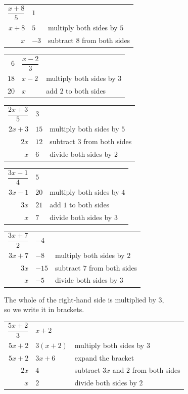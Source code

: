 \documentclass[aspectratio=169]{beamer}
\makeatletter
\newcommand{\steps}[1]{%
  \begin{tabular}{@{}r@{${}={}$}l@{\qquad}l@{}}#1\end{tabular}%
}
\newcommand{\by}[1]{{\normalsize #1}}
\makeatother
\begin{document}
  {\steps{$\dfrac{x+8}{5}$ & $1$ & \\[0.95em]
          $x+8$ & $5$ & \by{multiply both sides by $5$}\\
          $x$ & $-3$ & \by{subtract $8$ from both sides}}}

  {\steps{$6$ & $\dfrac{x-2}{3}$ & \\[0.95em]
          $18$ & $x-2$ & \by{multiply both sides by $3$}\\
          $20$ & $x$ & \by{add $2$ to both sides}}}

  {\steps{$\dfrac{2x+3}{5}$ & $3$ & \\[0.95em]
          $2x+3$ & $15$ & \by{multiply both sides by $5$}\\
          $2x$ & $12$ & \by{subtract $3$ from both sides}\\
          $x$ & $6$ & \by{divide both sides by $2$}}}

  {\steps{$\dfrac{3x-1}{4}$ & $5$ & \\[0.95em]
          $3x-1$ & $20$ & \by{multiply both sides by $4$}\\
          $3x$ & $21$ & \by{add $1$ to both sides}\\
          $x$ & $7$ & \by{divide both sides by $3$}}}

  {\steps{$\dfrac{3x+7}{2}$ & $-4$ & \\[0.95em]
          $3x+7$ & $-8$ & \by{multiply both sides by $2$}\\
          $3x$ & $-15$ & \by{subtract $7$ from both sides}\\
          $x$ & $-5$ & \by{divide both sides by $3$}}}

  {The whole of the right-hand side is multiplied by $3$,\\
   so we write it in brackets.
   \par\vspace{0.4em}
   \steps{$\dfrac{5x+2}{3}$ & $x+2$ & \\[0.95em]
          $5x+2$ & $3(x+2)$ & \by{multiply both sides by $3$}\\
          $5x+2$ & $3x+6$ & \by{expand the bracket}\\
          $2x$ & $4$ & \by{subtract $3x$ and $2$ from both sides}\\
          $x$ & $2$ & \by{divide both sides by $2$}}}
\end{document}
